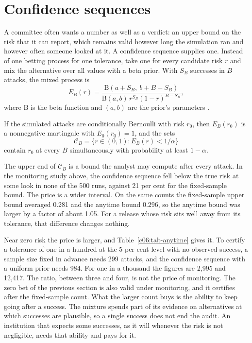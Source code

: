 \section{Confidence sequences}\label{c06:sec-cs}

A committee often wants a number as well as a verdict: an upper bound on the risk
that it can report, which remains valid however long the simulation ran and however
often someone looked at it. A confidence sequence supplies one. Instead of one
betting process for one tolerance, take one for every candidate risk $r$ and mix the
alternative over all values with a beta prior. With $S_B$ successes in $B$ attacks,
the mixed process is
\begin{equation}\label{c06:eq-mixture}
E_B(r) = \frac{\mathrm{B}(a + S_B,\ b + B - S_B)}
{\mathrm{B}(a,b)\, r^{S_B} (1-r)^{B - S_B}} ,
\end{equation}
where $\mathrm{B}$ is the beta function and $(a,b)$ are the prior's parameters
\citep{howard2021,ramdas2023}.

\begin{proposition}\label{c06:prop-cs}
If the simulated attacks are conditionally Bernoulli with risk $r_0$, then
$E_B(r_0)$ is a nonnegative martingale with $E_0(r_0) = 1$, and the sets
\begin{equation}\label{c06:eq-cs}
\mathcal{C}_B = \{ r \in (0,1) : E_B(r) < 1/\alpha \}
\end{equation}
contain $r_0$ at every $B$ simultaneously with probability at least $1 - \alpha$.
\end{proposition}

The upper end of $\mathcal{C}_B$ is a bound the analyst may compute after every
attack. In the monitoring study above, the confidence sequence fell below the true
risk at some look in none of the 500 runs, against 21 per cent for the fixed-sample
bound.
The price is a wider interval. On the same counts the fixed-sample upper bound
averaged 0.281 and the anytime bound 0.296, so the anytime bound was larger by a
factor of about 1.05.
For a release whose risk sits well away from its tolerance, that difference
changes nothing.

Near zero risk the price is larger, and Table~\ref{c06:tab-anytime} gives it. To
certify a tolerance of one in a hundred at the 5 per cent level with no observed
success, a sample size fixed in advance needs 299 attacks, and the confidence
sequence with a uniform prior needs 984. For one in a thousand the figures are 2,995
and 12,417. The ratio, between three and four, is not the price of monitoring.
The zero bet of the previous section is also valid under monitoring, and it
certifies after the fixed-sample count. What the larger count buys is the ability
to keep going after a success. The mixture spends part of its evidence on
alternatives at which successes are plausible, so a single success does not end the
audit. An institution that expects some successes, as it will whenever the risk is
not negligible, needs that ability and pays for it.


